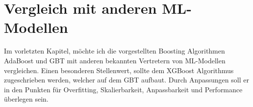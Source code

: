 \section {Vergleich mit anderen ML-Modellen}
Im vorletzten Kapitel, möchte ich die vorgestellten Boosting Algorithmen AdaBoost und GBT mit anderen bekannten Vertretern von ML-Modellen vergleichen. Einen besonderen Stellenwert, sollte dem XGBoost Algorithmus zugeschrieben werden, welcher auf dem GBT aufbaut. Durch Anpassungen soll er in den Punkten für Overfitting, Skalierbarkeit, Anpassbarkeit und Performance überlegen sein.

